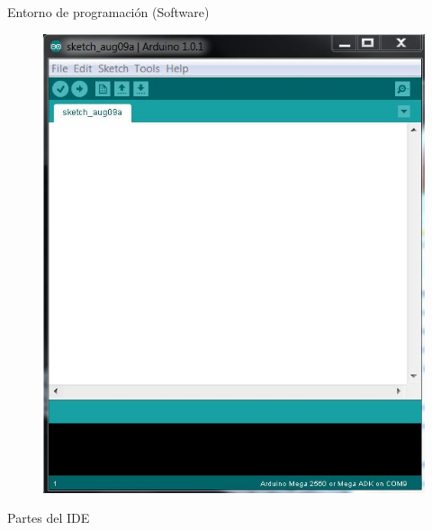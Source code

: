 \documentclass{beamer}
\begin{document}
	\begin{frame}{Entorno de programación (Software)}
		\begin{figure}
			\centering
			\includegraphics[scale = 0.45]{ide2}
		\end{figure}
	\end{frame}
	
	\begin{frame}{Partes del IDE}
		\begin{figure}
			\centering
			\def\svgwidth{\columnwidth}
			
		\end{figure}
	\end{frame}
	
\end{document}
